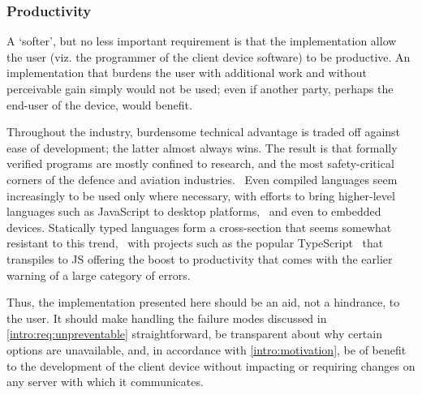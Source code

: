 \subsubsection{Productivity} \label{intro:req:productivity}
A `softer', but no less important requirement is that the implementation allow the user (viz. the programmer of the client device software) to be productive. An implementation that burdens the user with additional work and without perceivable gain simply would not be used; even if another party, perhaps the end-user of the device, would benefit.

Throughout the industry, burdensome technical advantage is traded off against ease of development; the latter almost always wins. The result is that formally verified programs are mostly confined to research, and the most safety-critical corners of the defence and aviation industries.~\cite{formal_verification_vs_testing} Even compiled languages seem increasingly to be used only where necessary, with efforts to bring higher-level languages such as JavaScript to desktop platforms,~\cite{electron} and even to embedded~\cite{jerryscript} devices. Statically typed languages form a cross-section that seems somewhat resistant to this trend,~\cite{static_vs_dynamic_productivity} with projects such as the popular TypeScript~\cite{typescript} that transpiles to JS offering the boost to productivity that comes with the earlier warning of a large category of errors.

Thus, the implementation presented here should be an aid, not a hindrance, to the user. It should make handling the failure modes discussed in \cref{intro:req:unpreventable} straightforward, be transparent about why certain options are unavailable, and, in accordance with \cref{intro:motivation}, be of benefit to the development of the client device without impacting or requiring changes on any server with which it communicates.